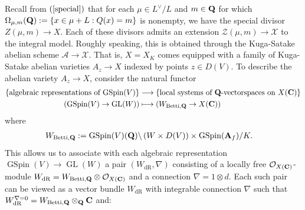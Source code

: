 \documentclass{amsart}
\theoremstyle{definition}
\theoremstyle{definition}
\theoremstyle{definition}
\begin{document}
Recall from $(\ref{special})$ that for each $\mu \in L^{\vee}/L$ and $m \in {\bf{Q}}$ for which $\Omega_{\mu, m}({\bf{Q}}) := \left\lbrace x \in \mu + L: Q(x) = m \right\rbrace$
is nonempty, we have the special divisor $Z(\mu, m) \rightarrow X$. 
Each of these divisors admits an extension $\mathcal{Z}(\mu, m) \rightarrow \mathcal{X}$ to the integral model. 
Roughly speaking, this is obtained through the Kuga-Satake abelian scheme $\mathcal{A} \rightarrow \mathcal{X}$.
That is, $X = X_K$ comes equipped with a family of Kuga-Satake abelian varieties $A_z \rightarrow X$ indexed by points $z \in D(V)$. 
To describe the abelian variety $A_z \rightarrow X$, consider the natural functor 
\begin{align*} \left\lbrace \text{algebraic representations of $\operatorname{GSpin}(V)$} \right\rbrace 
&\longrightarrow \left\lbrace \text{local systems of ${\bf{Q}}$-vectorspaces on $X({\bf{C}})$}  \right\rbrace \\ 
(\operatorname{GSpin}(V) \rightarrow \operatorname{GL}(W)) &\longmapsto (W_{\operatorname{Betti}, {\bf{Q}}} \rightarrow X({\bf{C}}))\end{align*}
where 
\begin{align*} W_{\operatorname{Betti}, {\bf{Q}}} &:= \operatorname{GSpin}(V)({\bf{Q}}) \backslash \left( W \times D(V) \right) 
\times \operatorname{GSpin}({\bf{A}}_f)/ K.\end{align*}
This allows us to associate with each algebraic representation
$\operatorname{GSpin}(V) \rightarrow \operatorname{GL}(W)$ a pair 
$(W_{\operatorname{dR}}, \nabla)$ consisting of a locally free $\mathcal{O}_{X({\bf{C}})}$-module 
$W_{\operatorname{dR}} = W_{\operatorname{Betti}, {\bf{Q}}} \otimes \mathcal{O}_{X({\bf{C}})}$ and 
a connection $\nabla = 1 \otimes d$. Each such pair can be viewed as a vector bundle $W_{\operatorname{dR}}$ 
with integrable connection $\nabla$ such that $W_{\operatorname{dR}}^{\nabla = 0} = W_{\operatorname{Betti}, {\bf{Q}}} \otimes_{\bf{Q}} {\bf{C}}$ and:\\
\end{document}
